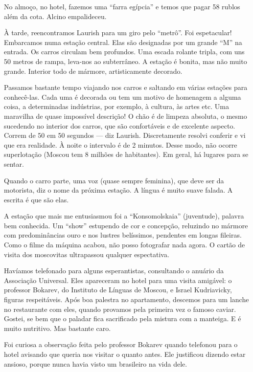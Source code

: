 No almoço, no hotel, fazemos uma ``farra egípcia'' e temos que pagar 58 rublos além da cota. Alcino empalideceu.

À tarde, reencontramos Laurish para um giro pelo ``metrô''. Foi espetacular! Embarcamos numa estação central. Elas são designadas por um grande ``M'' na entrada. Os carros circulam bem profundos. Uma escada rolante tripla, com uns 50 metros de rampa, leva-nos ao subterrâneo. A estação é bonita, mas não muito grande. Interior todo de mármore, artisticamente decorado.

Passamos bastante tempo viajando nos carros e saltando em várias estações para conhecê-las. Cada uma é decorada ou tem um motivo de homenagem a alguma coisa, a determinadas indústrias, por exemplo, à cultura, às artes etc. Uma maravilha de quase impossível descrição! O chão é de limpeza absoluta, o mesmo sucedendo no interior dos carros, que são confortáveis e de excelente aspecto. Correm de 50 em 50 segundos --- diz Laurish. Discretamente resolvi conferir e vi que era realidade. À noite o intervalo é de 2 minutos. Desse modo, não ocorre superlotação (Moscou tem 8 milhões de habitantes). Em geral, há lugares para se sentar.

Quando o carro parte, uma voz (quase sempre feminina), que deve ser da motorista, diz o nome da próxima estação. A língua é muito suave falada. A escrita é que são elas.

A estação que mais me entusiasmou foi a ``Konsomolskaia'' (juventude), palavra bem conhecida. Um ``show'' estupendo de cor e concepção, reluzindo no mármore com predominâncias ouro e nos lustres belíssimos, pendentes em longas fileiras. Como o filme da máquina acabou, não posso fotografar nada agora. O cartão de visita dos moscovitas ultrapassou qualquer espectativa.

Havíamos telefonado para alguns esperantistas, consultando o anuário da Associação Universal. Eles apareceram no hotel para uma visita amigável: o professor Bokarev, do Instituto de Línguas de Moscou, e Israel Kudriavicky, figuras respeitáveis. Após boa palestra no apartamento, descemos para um lanche no restaurante com eles, quando provamos pela primeira vez o famoso caviar. Gostei, se bem que o paladar fica sacrificado pela mistura com a manteiga. E é muito nutritivo. Mas bastante caro.

Foi curiosa a observação feita pelo professor Bokarev quando telefonou para o hotel avisando que queria nos visitar o quanto antes. Ele justificou dizendo estar ansioso, porque nunca havia visto um brasileiro na vida dele.

